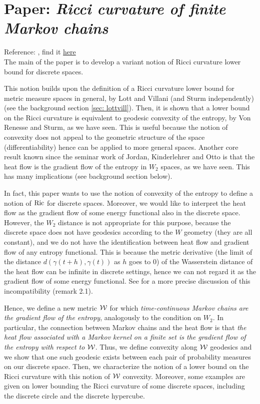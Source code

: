 \chapter{Paper: \textit{Ricci curvature of finite Markov chains}}
Reference: \cite{erbar2012ricci}, find it \href{https://link.springer.com/article/10.1007/s00205-012-0554-z#citeas}{here}
\\

The main of the paper is to develop a variant notion of Ricci curvature lower bound for discrete spaces. 

This notion builds upon the definition of a Ricci curvature lower bound for metric measure spaces in general, by Lott and Villani (and Sturm independently) (see the background section \ref{sec: lottvill}).
Then, it is shown that a lower bound on the Ricci curvature is equivalent to geodesic convexity of the entropy, by Von Renesse and Sturm, as we have seen. This is useful because the notion of convexity does not appeal to the geometric structure of the space (differentiability) hence can be applied to more general spaces. Another core result known since the seminar work of Jordan, Kinderlehrer and Otto is that the heat flow is the gradient flow of the entropy in $W_2$ spaces, as we have seen. This has many implications (see background section below).

In fact, this paper wants to use the notion of convexity of the entropy to define a notion of $\mathop{\mathrm{Ric}}\nolimits$ for discrete spaces. Moreover, we would like to interpret the heat flow as the gradient flow of some energy functional also in the discrete space. However, the $W_2$ distance is not appropriate for this purpose, because the discrete space does not have geodesics according to the $W$ geometry (they are all constant), and we do not have the identification between heat flow and gradient flow of any entropy functional. This is because the metric derivative (the limit of the distance $d(\gamma(t+h),\gamma(t))$ as $h$ goes to 0) of the Wasserstein distance of the heat flow can be infinite in discrete settings, hence we can not regard it as the gradient flow of some energy functional. See \cite{maas} for a more precise discussion of this incompatibility (remark 2.1). 

Hence, we define a new metric $\mathcal{W}$ for which \emph{time-continuous Markov chains are the gradient flow of the entropy}, analogously to the condition on $W_2$. In particular, the connection between Markov chains and the heat flow is that \emph{the heat flow associated with a Markov kernel on a finite set is the gradient flow of the entropy with respect to $\mathcal{W}$}. Thus, we define convexity along $\mathcal{W}$ geodesics and we show that one such geodesic exists between each pair of probability measures on our discrete space. Then, we characterize the notion of a lower bound on the Ricci curvature with this notion of $\mathcal{W}$ convexity. Moreover, some examples are given on lower bounding the Ricci curvature of some discrete spaces, including the discrete circle and the discrete hypercube.

